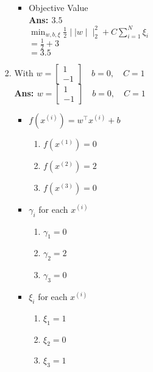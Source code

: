 \documentclass{article}
\theoremstyle{definition}
\theoremstyle{remark}
\begin{document}
\begin{enumerate}[font={\Large\bfseries},left=0pt]
\begin{tcolorbox}
\begin{enumerate}
\begin{enumerate}
\begin{itemize}
					            \item Objective Value \\
					                  \textbf{Ans: $3.5$} \\
					                  $\min_{w, b, \xi} \frac{1}{2} \mid\mid w \mid\mid^2_2 + C \sum^N_{i = 1} \xi_i $ \\
					                  $= \frac{1}{2} + 3$ \\
					                  $= 3.5$
				            \end{itemize}
				      \item With $w = \begin{bmatrix} 1 \\ -1\end{bmatrix} \quad b = 0, \quad C = 1$ \\
				            \textbf{Ans: $w = \begin{bmatrix} 1 \\ -1\end{bmatrix} \quad b = 0, \quad C = 1$}
				            \begin{itemize}
					            \item $f(x^{(i)}) = w^\intercal x^{(i)} + b$
					                  \begin{enumerate}
						                  \item $f(x^{(1)}) = 0$
						                  \item $f(x^{(2)}) = 2$
						                  \item $f(x^{(3)}) = 0$
					                  \end{enumerate}
					            \item $\gamma_i$ for each $x^{(i)}$
					                  \begin{enumerate}
						                  \item $\gamma_1 = 0$
						                  \item $\gamma_2 = 2$
						                  \item $\gamma_3= 0$
					                  \end{enumerate}
					            \item $\xi_i$ for each $x^{(i)}$
					                  \begin{enumerate}
						                  \item $\xi_1 = 1$
						                  \item $\xi_2 = 0$
						                  \item $\xi_3= 1$
					                  \end{enumerate}

\end{itemize}
\end{enumerate}
\end{enumerate}
\end{tcolorbox}
\end{enumerate}
\end{document}
